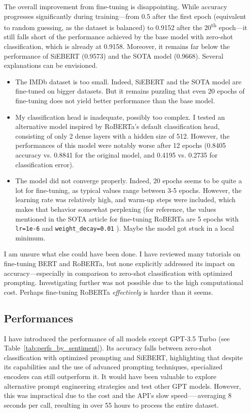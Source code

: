 \documentclass{article}
\begin{document}
The overall improvement from fine-tuning is disappointing. While accuracy progresses significantly during training—from 0.5 after the first epoch (equivalent to random guessing, as the dataset is balanced) to 0.9152 after the 20\textsuperscript{th} epoch—it still falls short of the performance achieved by the base model with zero-shot classification, which is already at 0.9158. Moreover, it remains far below the performance of SiEBERT (0.9573) and the SOTA model (0.9668). Several explanations can be envisioned.
\begin{itemize}
    \item The IMDb dataset is too small. Indeed, SiEBERT and the SOTA model are fine-tuned on bigger datasets. But it remains puzzling that even 20 epochs of fine-tuning does not yield better performance than the base model.
    \item My classification head is inadequate, possibly too complex. I tested an alternative model inspired by RoBERTa’s default classification head, consisting of only 2 dense layers with a hidden size of 512. However, the performances of this model were notably worse after 12 epochs (0.8405 accuracy vs. 0.8841 for the original model, and 0.4195 vs. 0.2735 for classification error).
    \item The model did not converge properly. Indeed, 20 epochs seems to be quite a lot for fine-tuning, as typical values range between 3-5 epochs. However, the learning rate was relatively high, and warm-up steps were included, which makes that behavior somewhat perplexing (for reference, the values mentioned in the SOTA article for fine-tuning RoBERTa are 5 epochs with \texttt{lr=1e-6} and \texttt{weight\_decay=0.01} \citep{csanady_llambert_2024}). Maybe the model got stuck in a local minimum.
\end{itemize}

I am unsure what else could have been done. I have reviewed many tutorials on fine-tuning BERT and RoBERTa, but none explicitly addressed its impact on accuracy---especially in comparison to zero-shot classification with optimized prompting. Investigating further was not possible due to the high computational cost. Perhaps fine-tuning RoBERTa \textit{effectively} is harder than it seems.

\subsection{Performances}

I have introduced the performance of all models except GPT-3.5 Turbo (see Table~\ref{tab:perfs_by_sentiment}). Its accuracy falls between zero-shot classification with optimized prompting and SiEBERT, highlighting that despite its capabilities and the use of advanced prompting techniques, specialized encoders can still outperform it. It would have been valuable to explore alternative prompt engineering strategies and test other GPT models. However, this was impractical due to the cost and the API's slow speed--—averaging 8 seconds per call, resulting in over 55 hours to process the entire dataset.
\end{document}
